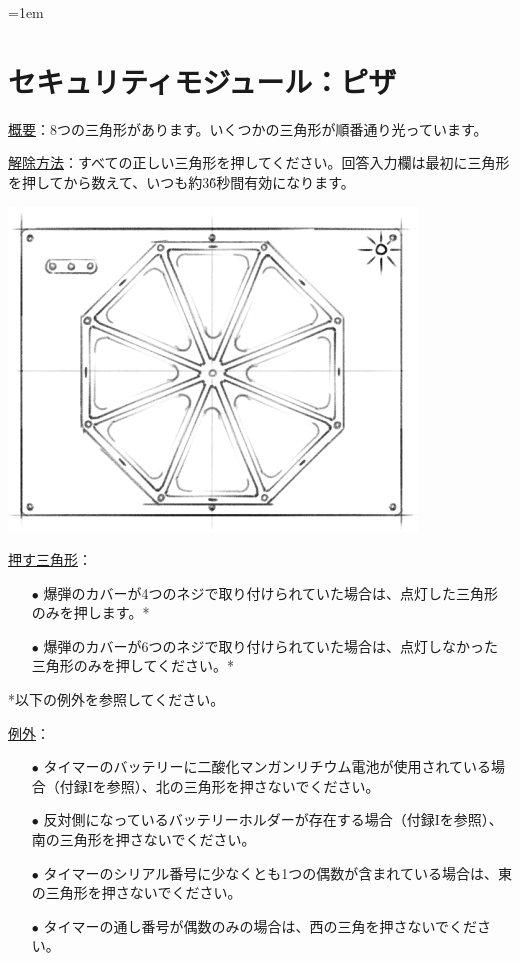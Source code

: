 \begin{minipage}{0.63\textwidth}
    \parskip=1em
    \section*{セキュリティモジュール：ピザ}
    
    \uline{概要}：8つの三角形があります。いくつかの三角形が順番通り光っています。

    \uline{解除方法}：すべての正しい三角形を押してください。回答入力欄は最初に三角形を押してから数えて{、}いつも約3\~6秒間有効になります。
\end{minipage}%
\hfill%
\begin{minipage}{0.33\textwidth}
    \includegraphics[width=\textwidth]{images/11.png}
    \vspace*{\fill}
\end{minipage}

\uline{押す三角形}：
\begin{itemize}
    \item[$\bullet$] 爆弾のカバーが4つのネジで取り付けられていた場合は{、}点灯した三角形のみを押します。{*}
    \item[$\bullet$] 爆弾のカバーが6つのネジで取り付けられていた場合は{、}点灯しなかった三角形のみを押してください。{*}
\end{itemize}
*以下の例外を参照してください。

\uline{例外}：
\begin{itemize}
    \item[$\bullet$] タイマーのバッテリーに二酸化マンガンリチウム電池が使用されている場合（付録Iを参照）{、}北の三角形を押さないでください。
    \item[$\bullet$] 反対側になっているバッテリーホルダーが存在する場合（付録Iを参照）{、}南の三角形を押さないでください。
    \item[$\bullet$] タイマーのシリアル番号に少なくとも1つの偶数が含まれている場合は{、}東の三角形を押さないでください。
    \item[$\bullet$] タイマーの通し番号が偶数のみの場合は{、}西の三角を押さないでください。
\end{itemize}

